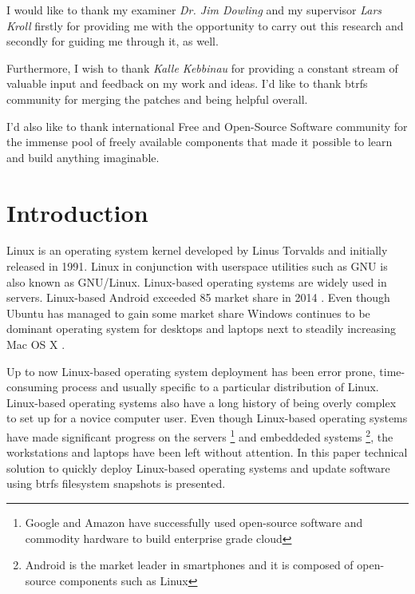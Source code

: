 \documentclass[a4paper,11pt]{kth-mag}
\begin{document}
I would like to thank my examiner \emph{Dr. Jim Dowling} and my supervisor \emph{Lars Kroll} firstly for providing me with the opportunity to carry out this research and secondly for guiding me through it, as well.

Furthermore, I wish to thank \emph{Kalle Kebbinau} for providing a constant
stream of valuable input and feedback on my work and ideas.
I'd like to thank \acrshort{btrfs} community for merging the patches and being helpful overall.

I'd also like to thank international Free and Open-Source Software community
for the immense pool of freely available components that made it possible
to learn and build anything imaginable.

\clearpage
\tableofcontents*
\mainmatter
\pagestyle{newchap}
\clearpage

%
%
%
%

\chapter{Introduction}
\label{chap:intro}

Linux is an operating system kernel
developed by Linus Torvalds \cite{linux-a-portable-operating-system}
and initially released in 1991.
Linux in conjunction with userspace utilities
such as GNU \cite{free-software-free-society} is also known as GNU/Linux.
Linux-based operating systems are widely used in servers.
Linux-based Android exceeded 85%
market share in 2014
\cite{android-market-share}.
Even though Ubuntu has managed to gain some market share
Windows continues to be dominant operating system for desktops
and laptops next to steadily increasing Mac OS X
\cite{desktop-market-share}.

Up to now Linux-based operating system deployment has been
error prone, time-consuming process and usually specific to
a particular distribution of Linux.
Linux-based operating systems also have a long history
of being overly complex to set up for a novice computer user.
Even though Linux-based operating systems have made significant
progress on the servers
\footnote{Google and Amazon have successfully used open-source software
and commodity hardware to build enterprise grade cloud}
and embeddeded systems
\footnote{Android is the market leader in smartphones and it is composed of open-source components such as Linux},
the workstations and laptops have been left without attention.
In this paper technical solution to quickly
deploy Linux-based operating systems
and update software using
\acrshort{btrfs} filesystem snapshots is presented.
\end{document}
